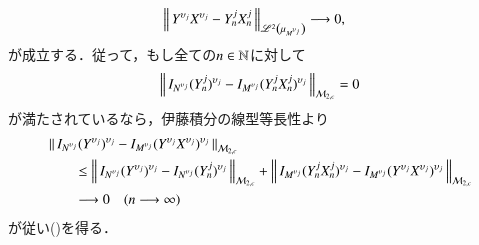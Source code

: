 \begin{prf}
\begin{description}
\begin{align}
					&\left\|\, Y^{\upsilon_j}X^{\upsilon_j} - Y^j_n X^j_n\, \right\|_{\mathscr{L}^{2} \left(\mu_{M^{\upsilon_j}}\right)} \longrightarrow 0, 
				\end{align}
				が成立する．従って，もし全ての$n \in \mathbb{N}$に対して
				\begin{align}
					\left\|\, I_{N^{\upsilon_j}} (Y_n^j)^{\upsilon_j} - I_{M^{\upsilon_j}} (Y^j_n X^j_n)^{\upsilon_j}\, \right\|_{\mathcal{M}_{2,c}}
					= 0
					\label{eq:Ito-Integral_on_M_c_loc_report_7_3}
				\end{align}
				が満たされているなら，伊藤積分の線型等長性より
				\begin{align}
					&\left\|\, I_{N^{\upsilon_j}} (Y^{\upsilon_j})^{\upsilon_j} - I_{M^{\upsilon_j}} (Y^{\upsilon_j}X^{\upsilon_j})^{\upsilon_j}\, \right\|_{\mathcal{M}_{2,c}} \\
					&\qquad \leq \left\|\, I_{N^{\upsilon_j}} (Y^{\upsilon_j})^{\upsilon_j} - I_{N^{\upsilon_j}} (Y^j_n)^{\upsilon_j}\, \right\|_{\mathcal{M}_{2,c}}
						+ \left\|\, I_{M^{\upsilon_j}} (Y_n^j X_n^j)^{\upsilon_j} - I_{M^{\upsilon_j}} (Y^{\upsilon_j}X^{\upsilon_j})^{\upsilon_j}\, \right\|_{\mathcal{M}_{2,c}} \\
					&\qquad \longrightarrow 0 \quad (n \longrightarrow \infty)
				\end{align}
				が従い()を得る．
			

\end{description}
\end{prf}
